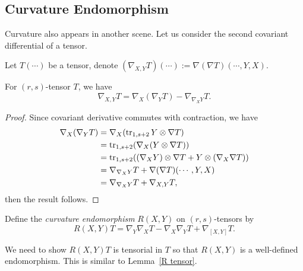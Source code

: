 \subsection*{Curvature Endomorphism}
Curvature also appears in another scene.
Let us consider the second covariant differential of a tensor.

\begin{defn}
    Let $T(\cdots)$ be a tensor, denote $(\nabla_{X,Y}T)(\cdots):=\nabla(\nabla T)(\cdots,Y,X)$.
\end{defn}

\begin{prop}
    For $(r,s)$-tensor $T$, we have
    \begin{equation}
        \nabla_{X,Y}T=\nabla_X(\nabla_YT)-\nabla_{\nabla_XY}T.\label{2nd cov deriv}
    \end{equation}
\end{prop}
\begin{proof}
    Since covariant derivative commutes with contraction, we have
    \begin{align*}
        \nabla_X(\nabla_YT)&=\nabla_X(\operatorname{tr}_{1,s+2}Y\otimes\nabla T)\\
        &=\operatorname{tr}_{1,s+2}(\nabla_X(Y\otimes\nabla T))\\
        &=\operatorname{tr}_{1,s+2}((\nabla_XY)\otimes\nabla T+Y\otimes(\nabla_X\nabla T))\\
        &=\nabla_{\nabla_XY}T+\nabla(\nabla T)(\cdots,Y,X)\\
        &=\nabla_{\nabla_XY}T+\nabla_{X,Y}T,
    \end{align*}
    then the result follows.
\end{proof}

\begin{defn}
    Define the \emph{curvature endomorphism} $R(X,Y)$ on $(r,s)$-tensors by
    \[R(X,Y)T=\nabla_Y\nabla_XT-\nabla_X\nabla_YT+\nabla_{[X,Y]}T.\]
\end{defn}

\begin{rem}
    We need to show $R(X,Y)T$ is tensorial in $T$ so that $R(X,Y)$ is a well-defined endomorphism.
    This is similar to Lemma~\ref{R tensor}.
\end{rem}

